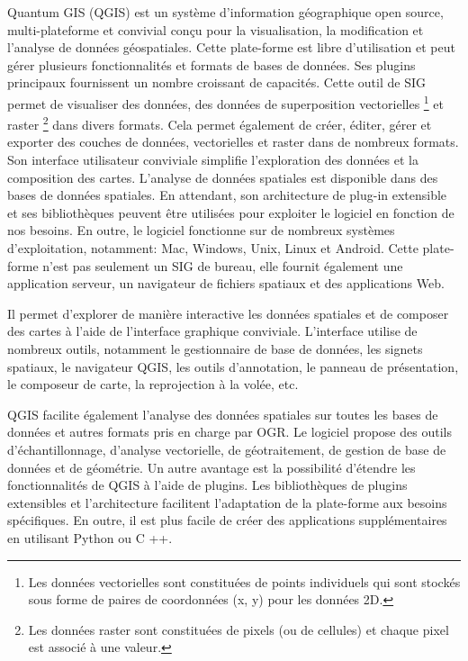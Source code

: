 \documentclass[french, a4paper, 12pt]{report}
\begin{document}
Quantum GIS (QGIS) est un système d’information géographique open source, multi-plateforme et convivial conçu pour la visualisation, la modification et l’analyse de données géospatiales. Cette plate-forme est libre d'utilisation et peut gérer plusieurs fonctionnalités et formats de bases de données. Ses plugins principaux fournissent un nombre croissant de capacités.
Cette outil de SIG permet de visualiser des données, des données de superposition vectorielles \footnote{Les données vectorielles sont constituées de points individuels qui sont stockés sous forme de paires de coordonnées (x, y) pour les données 2D.} et raster \footnote{Les données raster sont constituées de pixels (ou de cellules) et chaque pixel est associé à une valeur.} dans divers formats. Cela permet également de créer, éditer, gérer et exporter des couches de données, vectorielles et raster dans de nombreux formats. Son interface utilisateur conviviale simplifie l'exploration des données et la composition des cartes. L'analyse de données spatiales est disponible dans des bases de données spatiales. En attendant, son architecture de plug-in extensible et ses bibliothèques peuvent être utilisées pour exploiter le logiciel en fonction de nos besoins.
En outre, le logiciel fonctionne sur de nombreux systèmes d'exploitation, notamment: Mac, Windows, Unix, Linux et Android. Cette plate-forme n'est pas seulement un SIG de bureau, elle fournit également une application serveur, un navigateur de fichiers spatiaux et des applications Web.


Il permet d'explorer de manière interactive les données spatiales et de composer des cartes à l'aide de l'interface graphique conviviale. L'interface utilise de nombreux outils, notamment le gestionnaire de base de données, les signets spatiaux, le navigateur QGIS, les outils d'annotation, le panneau de présentation, le composeur de carte, la reprojection à la volée, etc.

QGIS facilite également l'analyse des données spatiales sur toutes les bases de données et autres formats pris en charge par OGR. Le logiciel propose des outils d'échantillonnage, d'analyse vectorielle, de géotraitement, de gestion de base de données et de géométrie. Un autre avantage est la possibilité d'étendre les fonctionnalités de QGIS à l'aide de plugins. Les bibliothèques de plugins extensibles et l'architecture facilitent l'adaptation de la plate-forme aux besoins spécifiques. En outre, il est plus facile de créer des applications supplémentaires en utilisant Python ou C ++.
\end{document}
